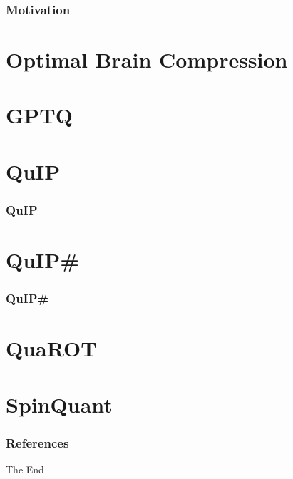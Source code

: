 \documentclass{beamer}
\theoremstyle{plain}
\theoremstyle{definition}
\theoremstyle{remark}
\numberwithin{equation}{section}
\numberwithin{figure}{section}
\numberwithin{theorem}{section}
\begin{document}
\begin{frame}
	\frametitle{Motivation}
	
	
\end{frame}
\section{Optimal Brain Compression}

\section{GPTQ}

\section{QuIP}
\begin{frame}
	\frametitle{QuIP}
\end{frame}
\section{QuIP\#}
\begin{frame}
	\frametitle{QuIP\#}
	
\end{frame}
\section{QuaROT}
\section{SpinQuant}


\begin{frame}[t, allowframebreaks]
\frametitle{References}
%
%
\end{frame}


\begin{frame}
\Huge{\centerline{The End}}
\end{frame}

\end{document}
